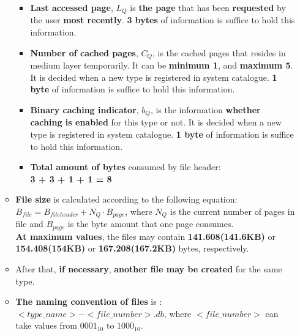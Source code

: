 \documentclass[12pt]{report}
\begin{document}
\begin{itemize}
\begin{itemize}
\begin{itemize}
\item \textbf{Last accessed page}, $L_Q$ is \textbf{the page} that has been \textbf{requested} by the user \textbf{most recently}. \textbf{3 bytes} of information is suffice to hold this information.
\item \textbf{Number of cached pages}, $C_Q$, is the cached pages that resides in medium layer temporarily. It can be \textbf{minimum 1}, and \textbf{maximum 5}. It is decided when a new type is registered in system catalogue. \textbf{1 byte} of information is suffice to hold this information.
\item \textbf{Binary caching indicator}, $b_Q$, is the information \textbf{whether caching is enabled} for this type or not. It is decided when a new type is registered in system catalogue. \textbf{1 byte} of information is suffice to hold this information.
\item \textbf{Total amount of bytes} consumed by file header: \\
\textbf{3 + 3 + 1 + 1 = 8}
\end{itemize}
\item \textbf{File size} is calculated according to the following equation: \\
{\large $B_{file} = B_{fileheader} + {N_Q}\cdot{B_{page}}$}, where $N_Q$ is the current number of pages in file and $B_{page}$ is the byte amount that one page consumes. \\
\textbf{At maximum values}, the files may contain \textbf{141.608(141.6KB)} or \textbf{154.408(154KB)} or \textbf{167.208(167.2KB)} bytes, respectively.
\item After that, \textbf{if necessary}, \textbf{another file may be created} for the same type.
\item \textbf{The naming convention of files} is : \\
$<type\_name>-<file\_number>.db$, where $<file\_number>$ can take values from $0001_{10} $ to $1000_{10}$.
\end{itemize}

\newpage


\end{itemize}
\end{document}

